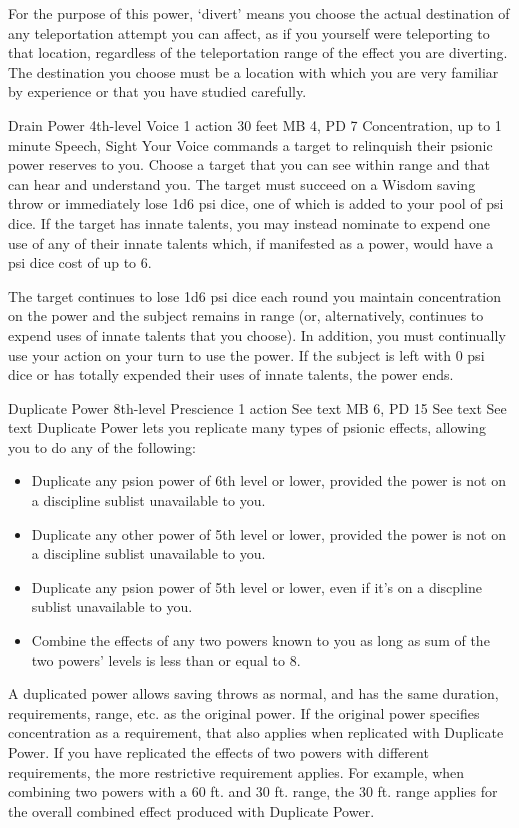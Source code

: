 For the purpose of this power, `divert' means you choose
the actual destination of any teleportation attempt you can
affect, as if you yourself were teleporting to that location,
regardless of the teleportation range of the effect you are
diverting. The destination you choose must be a location with
which you are very familiar by experience or that you have
studied carefully.

\DndPowerHeader%
    {Drain Power\label{pwr:drain_power}}
    {4th-level Voice}
    {1 action}
    {30 feet}
    {MB 4, PD 7}
    {Concentration, up to 1 minute}
    {Speech, Sight}
Your Voice commands a target to relinquish
their psionic power reserves to you. Choose a target that
you can see within range
and that can hear and understand you.
The target must succeed on a Wisdom
saving throw or immediately lose 1d6 psi dice, one of which
is added to your pool of psi dice. If the target has innate
talents, you may instead nominate to expend one use of any
of their innate talents which,
if manifested as a power,
would have a psi dice cost of up to 6.

The target continues to lose 1d6 psi dice each round you maintain
concentration on the power and the subject remains in range
(or, alternatively, continues to expend uses of innate talents
that you choose). In addition, you must continually use your
action on your turn to use the power. If the subject is left
with 0 psi dice or has totally expended their uses of innate
talents, the power ends.

\DndPowerHeader%
    {Duplicate Power\label{pwr:duplicate_power}}
    {8th-level Prescience}
    {1 action}
    {See text}
    {MB 6, PD 15}
    {See text}
    {See text}
Duplicate Power lets you replicate many types of psionic effects,
allowing you to do any of the following:
\begin{itemize}
  \item Duplicate any psion power of 6th level or lower,
        provided the power is not on a discipline sublist unavailable to you.
  \item Duplicate any other power of 5th level or lower,
        provided the power is not on a discipline sublist unavailable to you.
  \item Duplicate any psion power of 5th level or lower,
        even if it's on a discpline sublist unavailable to you.
  \item Combine the effects of any two powers known to you
        as long as sum of the two powers' levels is less than or equal to 8.
\end{itemize}
A duplicated power allows saving throws as normal, and has the same
duration, requirements, range, etc. as the original power.
If the original power specifies concentration as a requirement,
that also applies when replicated with Duplicate Power.
If you have replicated the effects of two powers with different requirements,
the more restrictive requirement applies.
For example, when combining two powers with a 60 ft. and 30 ft. range,
the 30 ft. range applies for the overall combined effect produced with Duplicate Power. 


